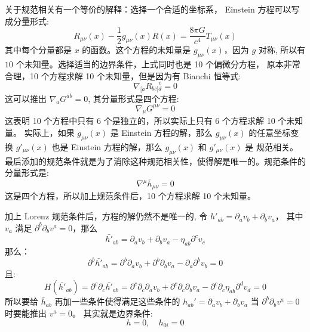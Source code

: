 \documentclass[lang=cn,a4paper,newtx]{elegantpaper}
\begin{document}
\begin{note}
关于规范相关有一个等价的解释：选择一个合适的坐标系，
 Einstein 方程可以写成分量形式:
$$
R_{\mu\nu}(x) - \frac{1}{2}g_{\mu\nu}(x)R(x) = \frac{8\pi G}{c^4}T_{\mu\nu}(x)
$$
其中每个分量都是 $x$ 的函数。这个方程的未知量是 $g_{\mu\nu}(x)$，因为 $g$ 对称,
所以有 $10$ 个未知量。选择适当的边界条件，上式同时也是 10 个偏微分方程，
原本非常合理，10 个方程求解 10 个未知量，但是因为有 Bianchi 恒等式:
$$
\nabla_{[a}R_{bc]d}^{\quad\ e} = 0
$$
这可以推出 $\nabla_aG^{ab} = 0$, 其分量形式是四个方程:
$$
\nabla_{\mu}G^{\mu\nu} = 0
$$
这表明 10 个方程中只有 6 个是独立的，所以实际上只有 6 个方程求解 10 个未知量。
实际上，如果 $g_{\mu\nu}(x)$ 是 Einstein 方程的解，那么 $g_{\mu\nu}(x)$ 的任意坐标变换
$g'_{\mu\nu}(x)$ 也是 Einstein 方程的解，那么 $g_{\mu\nu}(x)$ 和 $g'_{\mu\nu}(x)$ 是
规范相关。
最后添加的规范条件就是为了消除这种规范相关性，使得解是唯一的。规范条件的分量形式是:
$$
\nabla^{\mu}\bar{h}_{\mu\nu} = 0
$$
这是四个方程，所以加上规范条件后，10 个方程求解 10 个未知量。
\end{note}
加上 Lorenz 规范条件后，方程的解仍然不是唯一的, 令 $h'_{ab} = \partial_a v_b +
\partial_b v_a$，
其中 $v_a$ 满足 $\partial^b\partial_bv^a = 0$，那么 
$$
\bar{h'}_{ab} = \partial_a v_b + \partial_b v_a - \eta_{ab}\partial^c v_c
$$
那么：
$$
\partial^b\bar{h'}_{ab} = \partial^b\partial_a v_b + \partial^b\partial_b v_a - \partial_a\partial^b v_b
= 0
$$
且:
$$
H(\bar{h'}_{ab}) = \partial^c\partial_{c}\bar{h'}_{ab} = 
\partial^c\partial_{c}\partial_a v_b + \partial^c\partial_{c}\partial_b v_a -
\partial^c\partial_{c}\eta_{ab}\partial^d v_d = 0 
$$
所以要给 $\bar{h}_{ab}$ 再加一些条件使得满足这些条件的 $h_{ab}' = \partial_a v_b
+ \partial_b v_a$ 当 $\partial^b\partial_b v^a = 0$ 时要能推出 $v^a = 0$。
其实就是边界条件:
$$
h = 0, \quad h_{0i} = 0
$$
\end{document}
